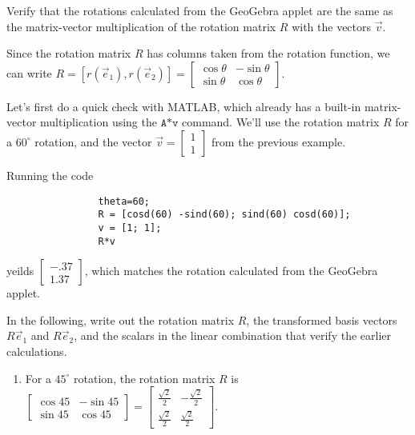 \documentclass{ximera}
\begin{document}
\begin{exploration}
\begin{remark}
\begin{example}
            Verify that the rotations calculated from the GeoGebra applet are the same as the matrix-vector multiplication of the rotation matrix $R$ with the vectors $\vec{v}$.

            Since the rotation matrix $R$ has columns taken from the rotation function, we can write $R=\left[r(\vec{e}_1), r(\vec{e}_2)\right]=\begin{bmatrix} \cos\theta & -\sin\theta \\ \sin\theta & \cos\theta \end{bmatrix}$.

            Let's first do a quick check with MATLAB, which already has a built-in matrix-vector multiplication using the $\texttt{A*v}$ command. We'll use the rotation matrix $R$ for a $60^\circ$ rotation, and the vector $\vec{v}=\begin{bmatrix} 1 \\ 1 \end{bmatrix}$ from the previous example. 

            Running the code

            \begin{verbatim}
                theta=60;
                R = [cosd(60) -sind(60); sind(60) cosd(60)];
                v = [1; 1];
                R*v
            \end{verbatim}

            yeilds $\begin{bmatrix} -.37 \\ 1.37 \end{bmatrix}$, which matches the rotation calculated from the GeoGebra applet.

            In the following, write out the rotation matrix $R$, the transformed basis vectors $R\vec{e}_1$ and $R\vec{e}_2$, and the scalars in the linear combination that verify the earlier calculations.

            \begin{enumerate}

                \item For a $45^\circ$ rotation, the rotation matrix $R$ is $\begin{bmatrix} \cos 45 & -\sin 45 \\ \sin 45 & \cos 45 \end{bmatrix} = \begin{bmatrix} \frac{\sqrt{2}}{2} & -\frac{\sqrt{2}}{2} \\ \frac{\sqrt{2}}{2} & \frac{\sqrt{2}}{2} \end{bmatrix}$.
                

\end{enumerate}
\end{example}
\end{remark}
\end{exploration}
\end{document}

